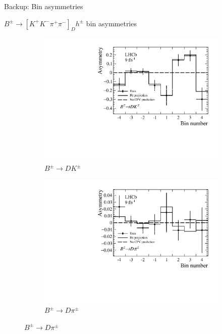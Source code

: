 \documentclass[xcolor={dvipsnames}]{beamer}
\begin{document}
\begin{frame}{Backup: Bin asymmetries}
  \begin{center}
    $B^\pm\to[K^+K^-\pi^+\pi^-]_Dh^\pm$ bin asymmetries
  \end{center}
  \begin{figure}
    \centering
    \begin{subfigure}{0.5\textwidth}
      \centering
      \includegraphics[width=1.0\textwidth]{Plots/BinAsymmetries_dk_KKpipi.pdf}
      \caption*{$B^\pm\to DK^\pm$}
    \end{subfigure}%
    \begin{subfigure}{0.5\textwidth}
      \centering
      \includegraphics[width=1.0\textwidth]{Plots/BinAsymmetries_dpi_KKpipi.pdf}
      \caption*{$B^\pm\to D\pi^\pm$}
    \end{subfigure}
  \end{figure}
\end{frame}
\end{document}
